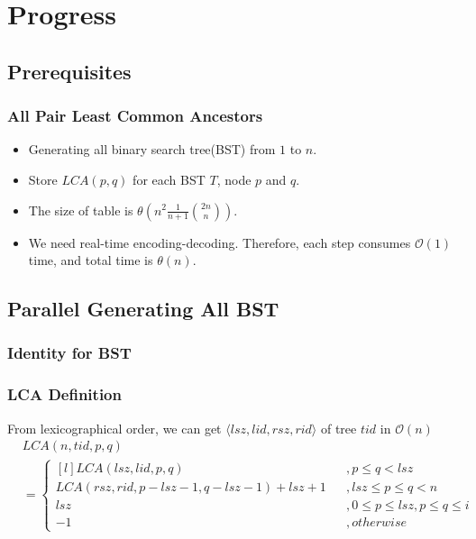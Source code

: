 \section{Progress}

\subsection{Prerequisites}
\begin{frame}
    \frametitle{All Pair Least Common Ancestors}
    \begin{itemize}
    	\setlength\itemsep{1em}
    	\item Generating all binary search tree(BST) from $1$ to $n$.
    	\item Store $\textit{LCA}(p, q)$ for each BST $T$, node $p$ and $q$.
		\item The size of table is $\theta(n^2 \frac{1}{n+1} \binom{2n}{n})$.
		\item We need real-time encoding-decoding. Therefore, 
			each step consumes $\mathcal{O}(1)$ time, 
			and total time is $\mathcal{\theta}(n)$.
    \end{itemize}
\end{frame}

\subsection{Parallel Generating All BST}
\begin{frame}
	\frametitle{Identity for BST}
		
		
		
\end{frame}

\begin{frame}
	\frametitle{LCA Definition}
	From lexicographical order, we can get $\langle\mathit{lsz},\mathit{lid},\mathit{rsz},\mathit{rid}\rangle$ 
	of tree $\mathit{tid}$ in $\mathcal{O}(n)$
	\begin{align*}
		& \mathit{LCA}(n, \mathit{tid}, p, q) \\
			&= \left\{\begin{matrix*}[l]
 				\mathit{LCA}(\mathit{lsz}, \mathit{lid}, p, q) &&, p \le q < \mathit{lsz}\\ 
 				\mathit{LCA}(\mathit{rsz}, \mathit{rid}, p-\mathit{lsz}-1, q-\mathit{lsz}-1)+\mathit{lsz}+1 &&, 
 						\mathit{lsz} \le p \le q < n \\ 
 				\mathit{lsz} && , 0 \le p \le \mathit{lsz}, p \le q \le i\\ 
 				-1 && ,\mathit{otherwise}
			\end{matrix*}\right.
	\end{align*}
\end{frame}

